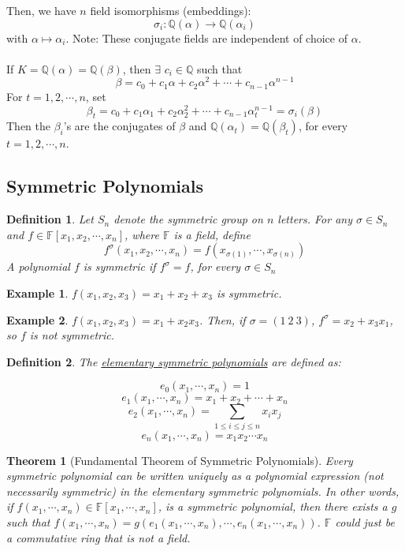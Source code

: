 \documentclass{article}
\newcommand{\Q}{\mathbb{Q}}
\newtheorem{theorem}{Theorem}[subsection]
\newtheorem{example}{Example}[subsection]
\newtheorem{definition}{Definition}[subsection]
\begin{document}
Then, we have $n$ field isomorphisms (embeddings):
$$\sigma_i: \Q(\alpha)\rightarrow \Q(\alpha_i)$$
with $\alpha\mapsto \alpha_i$.
Note: These conjugate fields are independent of choice of $\alpha$. \\
\\
If $K=\Q(\alpha)=\Q(\beta)$, then $\exists$ $c_i\in\Q$ such that
$$\beta = c_0+c_1\alpha + c_2\alpha^2+\cdots + c_{n-1}\alpha^{n-1}$$
For $t=1,2,\cdots, n$, set
$$\beta_t=c_0+c_1\alpha_1+c_2\alpha_2^2+\cdots + c_{n-1}\alpha_t^{n-1}=\sigma_i(\beta)$$
Then the $\beta_i$'s are the conjugates of $\beta$ and $\Q(\alpha_t)=\Q(\beta_t)$, for every $t=1,2,\cdots, n$.
\newpage
\subsection{Symmetric Polynomials}
\begin{definition}
Let $S_n$ denote the symmetric group on $n$ letters. For any $\sigma\in S_n$ and $f\in\mathbb{F}[x_1,x_2,\cdots, x_n]$, where $\mathbb{F}$ is a field, define
$$f^\sigma(x_1,x_2,\cdots, x_n)=f(x_{\sigma(1)},\cdots, x_{\sigma(n)})$$
A polynomial $f$ is symmetric if $f^\sigma=f$, for every $\sigma\in S_n$
\end{definition}
\begin{example}
$f(x_1,x_2,x_3)=x_1+x_2+x_3$ is symmetric. 
\end{example}
\begin{example}
$f(x_1,x_2,x_3)=x_1+x_2x_3$. Then, if $\sigma = (1\ 2\ 3)$, $f^\sigma=x_2+x_3x_1$, so $f$ is not symmetric.
\end{example}
\begin{definition}
The \underline{elementary symmetric polynomials} are defined as:

$$e_0(x_1,\cdots, x_n) = 1$$
$$e_1(x_1,\cdots, x_n)=x_1+x_2+\cdots + x_n$$
$$e_2(x_1,\cdots, x_n) = \displaystyle\sum_{1\leq i\leq j\leq n}x_ix_j$$
$$e_n(x_1,\cdots, x_n)=x_1x_2\cdots x_n$$
\end{definition}
\begin{theorem}[Fundamental Theorem of Symmetric Polynomials]
Every symmetric polynomial can be written uniquely as a polynomial expression (not necessarily symmetric) in the elementary symmetric polynomials. In other words, if $f(x_1,\cdots, x_n)\in\mathbb{F}[x_1,\cdots, x_n]$, is a symmetric polynomial, then there exists a $g$ such that $f(x_1,\cdots, x_n)=g(e_1(x_1,\cdots, x_n),\cdots, e_n(x_1,\cdots, x_n))$. $\mathbb{F}$ could just be a commutative ring that is not a field.
\end{theorem}
\end{document}
